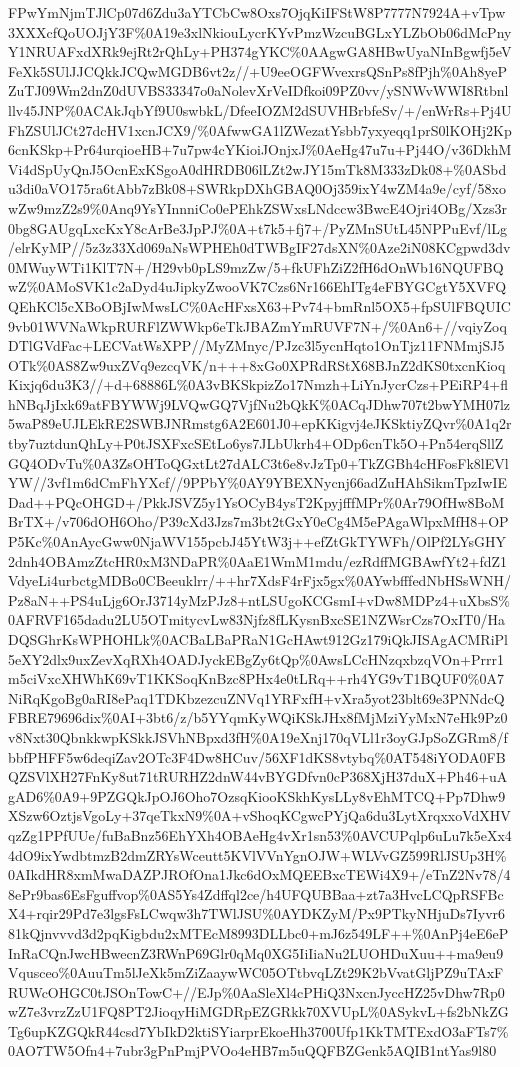 \documentclass[]{article}
\begin{document}
FPwYmNjmTJlCp07d6Zdu3aYTCbCw8Oxs7OjqKiIFStW8P7777N7924A+vTpw3XXXcfQoUOJjY3F\%0A19e3xlNkiouLycrKYvPmzWzcuBGLxYLZbOb06dMcPnyY1NRUAFxdXRk9ejRt2rQhLy+PH374gYKC\%0AAgwGA8HBwUyaNInBgwfj5eVFeXk5SUlJJCQkkJCQwMGDB6vt2z//+U9eeOGFWvexrsQSnPs8fPjh\%0Ah8yePZuTJ09Wm2dnZ0dUVBS33347o0aNolevXrVeIDfkoi09PZ0vv/ySNWvWWI8Rtbnlllv45JNP\%0ACAkJqbYf9U0swbkL/DfeeIOZM2dSUVHBrbfeSv/+/enWrRs+Pj4UFhZSUlJCt27dcHV1xcnJCX9/\%0AfwwGA1lZWezatYsbb7yxyeqq1prS0lKOHj2Kp6cnKSkp+Pr64urqioeHB+7u7pw4cYKioiJOnjxJ\%0AeHg47u7u+Pj44O/v36DkhMVi4dSpUyQnJ5OcnExKSgoA0dHRDB06lLZt2wJY15mTk8M333zDk08+\%0ASbdu3di0aVO175ra6tAbb7zBk08+SWRkpDXhGBAQ0Oj359ixY4wZM4a9e/cyf/58xowZw9mzZ2s9\%0Anq9YsYInnniCo0ePEhkZSWxsLNdccw3BwcE4Ojri4OBg/Xzs3r0bg8GAUgqLxcKxY8cArBe3JpPJ\%0A+t7k5+fj7+/PyZMnSUtL45NPPuEvf/lLg/elrKyMP//5z3z33Xd069aNsWPHEh0dTWBgIF27dsXN\%0Aze2iN08KCgpwd3dv0MWuyWTi1KlT7N+/H29vb0pLS9mzZw/5+fkUFhZiZ2fH6dOnWb16NQUFBQwZ\%0AMoSVK1c2aDyd4uJipkyZwooVK7Czs6Nr166EhITg4eFBYGCgtY5XVFQQEhKCl5cXBoOBjIwMwsLC\%0AcHFxsX63+Pv74+bmRnl5OX5+fpSUlFBQUIC9vb01WVNaWkpRURFlZWWkp6eTkJBAZmYmRUVF7N+/\%0An6+//vqiyZoqDTlGVdFac+LECVatWsXPP//MyZMnyc/PJzc3l5ycnHqto1OnTjz11FNMmjSJ5OTk\%0AS8Zw9uxZVq9ezcqVK/n+++8xGo0XPRdRStX68BJnZ2dKS0txcnKioqKixjq6du3K3//+d+68886L\%0A3vBKSkpizZo17Nmzh+LiYnJycrCzs+PEiRP4+flhNBqJjIxk69atFBYWWj9LVQwGQ7VjfNu2bQkK\%0ACqJDhw707t2bwYMH07lz5waP89eUJLEkRE2SWBJNRmstg6A2E601J0+epKKigvj4eJKSktiyZQvr\%0A1q2rtby7uztdunQhLy+P0tJSXFxcSEtLo6ys7JLbUkrh4+ODp6cnTk5O+Pn54erqSllZGQ4ODvTu\%0A3ZsOHToQGxtLt27dALC3t6e8vJzTp0+TkZGBh4cHFosFk8lEVlYW//3vf1m6dCmFhYXcf//9PPbY\%0AY9YBEXNycnj66adZuHAhSikmTpzIwIEDad++PQcOHGD+/PkkJSVZ5y1YsOCyB4ysT2KpyjfffMPr\%0Ar79OfHw8BoMBrTX+/v706dOH6Oho/P39cXd3Jzs7m3bt2tGxY0eCg4M5ePAgaWlpxMfH8+OPP5Kc\%0AnAycGww0NjaWV155pcbJ45YtW3j++efZtGkTYWFh/OlPf2LYsGHY2dnh4OBAmzZtcHR0xM3NDaPR\%0AaE1WmM1mdu/ezRdffMGBAwfYt2+fdZ1VdyeLi4urbctgMDBo0CBeeuklrr/++hr7XdsF4rFjx5gx\%0AYwbfffedNbHSsWNH/Pz8aN++PS4uLjg6OrJ3714yMzPJz8+ntLSUgoKCGsmI+vDw8MDPz4+uXbsS\%0AFRVF165dadu2LU5OTmitycvLw83Njfz8fLKysnBxcSE1NZWsrCzs7OxIT0/HaDQSGhrKsWPHOHLk\%0ACBaLBaPRaN1GcHAwt912Gz179iQkJISAgACMRiPl5eXY2dlx9uxZevXqRXh4OADJyckEBgZy6tQp\%0AwsLCcHNzqxbzqVOn+Prrr1m5ciVxcXHWhK69vT1KKSoqKnBzc8PHx4e0tLRq++rh4YG9vT1BQUF0\%0A7NiRqKgoBg0aRI8ePaq1TDKbzezcuZNVq1YRFxfH+vXra5yot23blt69e3PNNdcQFBRE79696dix\%0AI+3bt6/z/b5YYqmKyWQiKSkJHx8fMjMziYyMxN7eHk9Pz0v8Nxt30QbnkkwpKSkkJSVhNBpxd3fH\%0A19eXnj170qVLl1r3oyGJpSoZGRm8/fbbfPHFF5w6deqiZav2OTc3F4Dw8HCuv/56XF1dKS8vtybq\%0AT548iYODA0FBQZSVlXH27FnKy8ut71tRURHZ2dnW44vBYGDfvn0cP368XjH37duX+Ph46+uAgAD6\%0A9+9PZGQkJpOJ6Oho7OzsqKiooKSkhKysLLy8vEhMTCQ+Pp7Dhw9XSzw6OztjsVgoLy+37qeTkxN9\%0A+vShoqKCgwcPYjQa6du3LytXrqxxoVdXHVqzZg1PPfUUe/fuBaBnz56EhYXh4OBAeHg4vXr1sn53\%0AVCUPqlp6uLu7k5eXx44dO9ixYwdbtmzB2dmZRYsWceutt5KVlVVnYgnOJW+WLVvGZ599RlJSUp3H\%0AIkdHR8xmMwaDAZPJROfOna1Jkc6dOxMQEEBxcTEWi4X9+/eTnZ2Nv78/48ePr9bas6EsFguffvop\%0AS5Ys4Zdffql2ce/h4UFQUBBaa+zt7a3HvcLCQpRSFBcX4+rqir29Pd7e3lgsFsLCwqw3h7TWlJSU\%0AYDKZyM/Px9PTkyNHjuDs7Iyvr681kQjnvvvd3d2pqKigbdu2xMTEcM8993DLLbc0+mJ6z549LF++\%0AnPj4eE6ePInRaCQnJwcHBwecnZ3RWnP69Glr0qMq0XG5IiIiaNu2LUOHDuXuu++ma9eu9Vqusceo\%0AuuTm5lJeXk5mZiZaaywWC05OTtbvqLZt29K2bVvatGljPZ9uTAxFRUWcOHGC0tJSOnTowC+//EJp\%0AaSleXl4cPHiQ3NxcnJyccHZ25vDhw7Rp0wZ7e3vrzZzU1FQ8PT2JioqyHiMGDRpEZGRkk70XVUpL\%0ASykvL+fs2bNkZGTg6upKZGQkR44csd7YbIkD2ktiSYiarprEkoeHh3700Ufp1KkTMTExdO3aFTs7\%0AO7TW5Ofn4+7ubr3gPnPmjPVOo4eHB7m5uQQFBZGenk5AQIB1ntYas9l80
\end{document}

